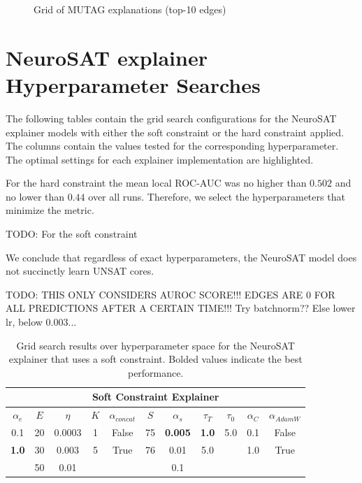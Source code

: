 \begin{figure}[htbp]
    \centering
    \caption{Grid of MUTAG explanations (top-10 edges)}
    \label{fig:grid-MUTAG-explanations}
\end{figure}

\clearpage
\section{NeuroSAT explainer Hyperparameter Searches}

The following tables contain the grid search configurations for the NeuroSAT explainer models with either the soft constraint or the hard constraint applied. The columns contain the values tested for the corresponding hyperparameter. The optimal settings for each explainer implementation are highlighted.

For the hard constraint the mean local ROC-AUC was no higher than $0.502$ and no lower than $0.44$ over all runs. Therefore, we select the hyperparameters that minimize the metric.

TODO: For the soft constraint

We conclude that regardless of exact hyperparameters, the NeuroSAT model does not succinctly learn UNSAT cores.

TODO: THIS ONLY CONSIDERS AUROC SCORE!!! EDGES ARE 0 FOR ALL PREDICTIONS AFTER A CERTAIN TIME!!! Try batchnorm?? Else lower lr, below 0.003...


\begin{table}[h]
  \centering
  \scriptsize
  \begin{tabular}{|c|c|c|c|c|c|c|c|c|c|c|}
  \hline
  \multicolumn{11}{|c|}{\textbf{Soft Constraint Explainer}} \\ \hline
  $\alpha_e$ & $E$ & $\eta$ & $K$ & $\alpha_{concat}$ & $S$ & $\alpha_s$ & $\tau_T$ & $\tau_0$ & $\alpha_{C}$ & $\alpha_{AdamW}$ \\ \hline
  0.1 & 20 & 0.0003 & 1 & False & 75 & \textbf{0.005} & \textbf{1.0} & 5.0 & 0.1 & False\\ 
  \textbf{1.0} & 30 & 0.003 & 5 & True & 76 & 0.01 & 5.0 &  & 1.0 & True\\ 
   & 50 & 0.01 &  &  &  & 0.1 &  &  & & \\ \hline
  \end{tabular}
  \caption[NeuroSAT soft constraint Sweep]{Grid search results over hyperparameter space for the NeuroSAT explainer that uses a soft constraint. Bolded values indicate the best performance.}
\end{table}


